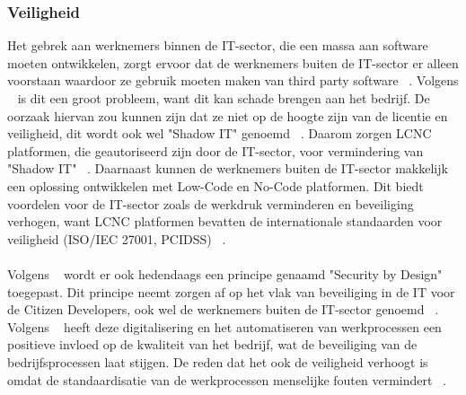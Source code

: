 \subsubsection{Veiligheid}
\label{subsec:veiligheid}
Het gebrek aan werknemers binnen de IT-sector, die een massa aan software moeten ontwikkelen, 
zorgt ervoor dat de werknemers buiten de IT-sector er alleen voorstaan waardoor ze gebruik moeten maken van third party software ~\autocite{Yan2021}. 
Volgens ~\textcite{Yan2021} is dit een groot probleem, want dit kan schade brengen aan het bedrijf. 
De oorzaak hiervan zou kunnen zijn dat ze niet op de hoogte zijn van de licentie en veiligheid, dit wordt ook wel "Shadow IT" genoemd 
~\autocite{Rokis_2022}. Daarom zorgen LCNC platformen, die geautoriseerd zijn door de IT-sector, voor vermindering van "Shadow IT" ~\autocite{Yan2021}. 
Daarnaast kunnen de werknemers buiten de IT-sector makkelijk een oplossing ontwikkelen met Low-Code en No-Code platformen.
Dit biedt voordelen voor de IT-sector zoals de werkdruk verminderen en beveiliging verhogen, 
want LCNC platformen bevatten de internationale standaarden voor veiligheid (ISO/IEC 27001, PCIDSS) ~\autocite{Sufi_2023}.
\\
\\
Volgens ~\textcite{Sufi_2023} wordt er ook hedendaags een principe genaamd "Security by Design" toegepast. 
Dit principe neemt zorgen af op het vlak van beveiliging in de IT voor de Citizen Developers, ook wel de werknemers buiten de IT-sector genoemd ~\autocite{Sufi_2023}. 
Volgens ~\textcite{Elshan2023} heeft deze digitalisering en het automatiseren van werkprocessen een positieve invloed op de kwaliteit van het bedrijf, wat 
de beveiliging van de bedrijfsprocessen laat stijgen. De reden dat het ook de veiligheid verhoogt is omdat de standaardisatie van de werkprocessen menselijke fouten vermindert ~\autocite{Elshan2023}.
